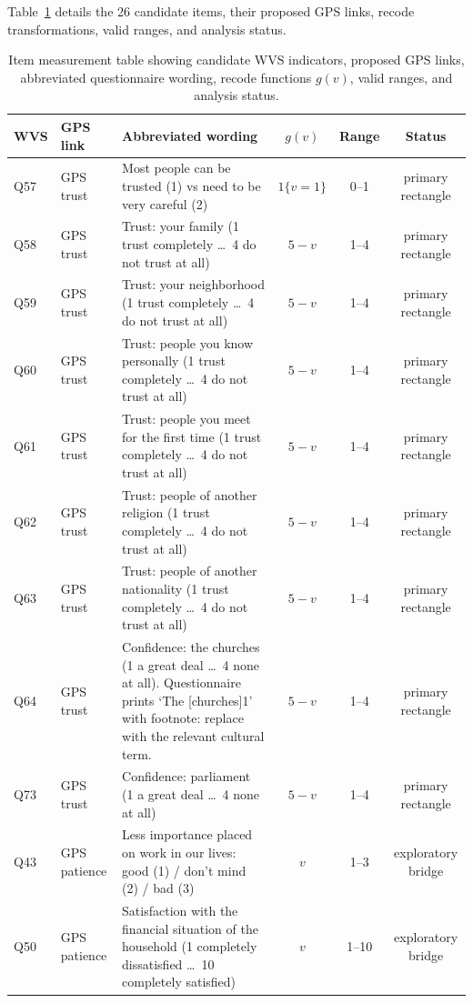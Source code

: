 Table~\ref{tab:items} details the 26 candidate items, their proposed GPS links, recode transformations, valid ranges, and analysis status.

\begin{table}[p]\centering\tiny\renewcommand{\arraystretch}{0.95}\setlength{\tabcolsep}{3pt}
\caption{Item measurement table showing candidate WVS indicators, proposed GPS links, abbreviated questionnaire wording, recode functions $g(v)$, valid ranges, and analysis status.}\label{tab:items}
\begin{tabularx}{\textwidth}{llXccc}\toprule
WVS & GPS link & Abbreviated wording & $g(v)$ & Range & Status \\\midrule
Q57 & GPS trust & Most people can be trusted (1) vs need to be very careful (2) & $1\{v=1\}$ & 0--1 & primary rectangle \\
Q58 & GPS trust & Trust: your family (1 trust completely \dots\ 4 do not trust at all) & $5-v$ & 1--4 & primary rectangle \\
Q59 & GPS trust & Trust: your neighborhood (1 trust completely \dots\ 4 do not trust at all) & $5-v$ & 1--4 & primary rectangle \\
Q60 & GPS trust & Trust: people you know personally (1 trust completely \dots\ 4 do not trust at all) & $5-v$ & 1--4 & primary rectangle \\
Q61 & GPS trust & Trust: people you meet for the first time (1 trust completely \dots\ 4 do not trust at all) & $5-v$ & 1--4 & primary rectangle \\
Q62 & GPS trust & Trust: people of another religion (1 trust completely \dots\ 4 do not trust at all) & $5-v$ & 1--4 & primary rectangle \\
Q63 & GPS trust & Trust: people of another nationality (1 trust completely \dots\ 4 do not trust at all) & $5-v$ & 1--4 & primary rectangle \\
Q64 & GPS trust & Confidence: the churches (1 a great deal \dots\ 4 none at all). Questionnaire prints `The [churches]1' with footnote: replace with the relevant cultural term. & $5-v$ & 1--4 & primary rectangle \\
Q73 & GPS trust & Confidence: parliament (1 a great deal \dots\ 4 none at all) & $5-v$ & 1--4 & primary rectangle \\
Q43 & GPS patience & Less importance placed on work in our lives: good (1) / don't mind (2) / bad (3) & $v$ & 1--3 & exploratory bridge \\
Q50 & GPS patience & Satisfaction with the financial situation of the household (1 completely dissatisfied \dots\ 10 completely satisfied) & $v$ & 1--10 & exploratory bridge \\

\end{tabularx}
\end{table}
